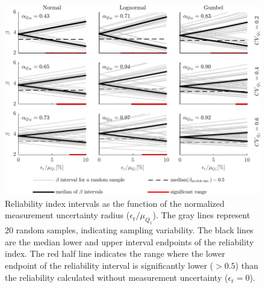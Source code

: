 \begin{figure}[htbp!] 
	\centering    
	\includegraphics[]{beta_interval_small_multiples.pdf}
	\caption{Reliability index intervals as the function of the normalized measurement uncertainty radius ($\epsilon_\mathrm{r}/\mu_{Q_1}$). The gray lines represent 20 random samples, indicating sampling variability. The black lines are the median lower and upper interval endpoints of the reliability index. The red half line indicates the range where the lower endpoint of the reliability interval is significantly lower ($>0.5$) than the reliability calculated without measurement uncertainty ($\epsilon_\mathrm{r} = 0$).}
	\label{fig:beta_interval_small_multiples}
\end{figure}

